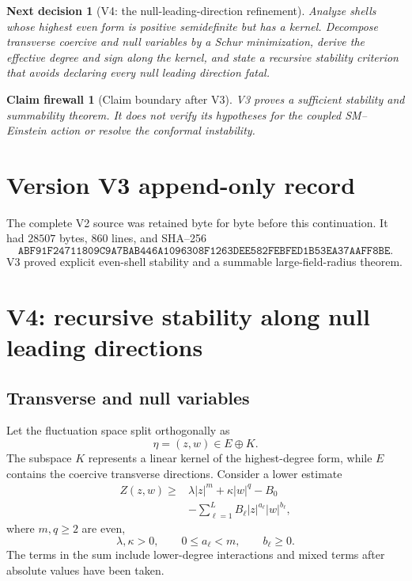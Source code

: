 \documentclass[11pt]{article}
\newtheorem{firewall}[theorem]{Claim firewall}
\newtheorem{decision}[theorem]{Next decision}
\theoremstyle{remark}
\begin{document}
\begin{decision}[V4: the null-leading-direction refinement]
\label{dec:v17v3-next}
Analyze shells whose highest even form is positive semidefinite but
has a kernel.  Decompose transverse coercive and null variables by a
Schur minimization, derive the effective degree and sign along the
kernel, and state a recursive stability criterion that avoids
declaring every null leading direction fatal.
\end{decision}

\begin{firewall}[Claim boundary after V3]
\label{fire:v17v3}
V3 proves a sufficient stability and summability theorem.  It does
not verify its hypotheses for the coupled SM--Einstein action or
resolve the conformal instability.
\end{firewall}

\section*{Version V3 append-only record}
The complete V2 source was retained byte for byte before this
continuation.  It had \(28507\) bytes, \(860\) lines, and SHA--256
\[
 \texttt{ABF91F24711809C9A7BAB446A1096308F1263DEE582FEBFED1B53EA37AAFF8BE}.
\]
V3 proved explicit even-shell stability and a summable
large-field-radius theorem.


\section{V4: recursive stability along null leading directions}
\label{sec:v17v4}

\subsection{Transverse and null variables}

Let the fluctuation space split orthogonally as
\[
 \eta=(z,w)\in E\oplus K.                            \tag{4.1}
\]
The subspace \(K\) represents a linear kernel of the highest-degree
form, while \(E\) contains the coercive transverse directions.
Consider a lower estimate
\[
\begin{split}
 Z(z,w)\geq&
 \lambda|z|^m+\kappa|w|^q-B_0\\
 &-\sum_{\ell=1}^L
 B_\ell|z|^{a_\ell}|w|^{b_\ell},                   \tag{4.2}
\end{split}
\]
where \(m,q\geq2\) are even,
\[
 \lambda,\kappa>0,\qquad
 0\leq a_\ell<m,\qquad b_\ell\geq0.                \tag{4.3}
\]
The terms in the sum include lower-degree interactions and mixed
terms after absolute values have been taken.
\end{document}
